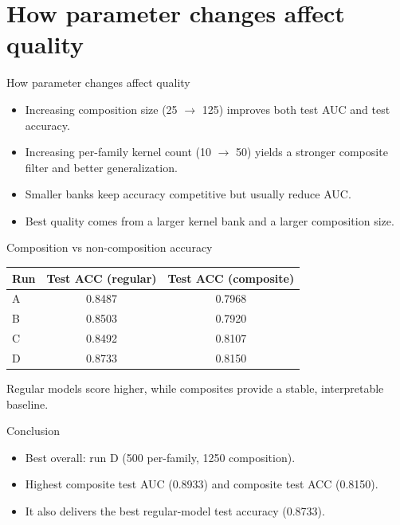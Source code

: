 \documentclass[aspectratio=169]{beamer}
\begin{document}
\section*{How parameter changes affect quality}
\begin{frame}{How parameter changes affect quality}
  \begin{itemize}
    \item Increasing composition size (25 $\rightarrow$ 125) improves both test AUC and test accuracy.
    \item Increasing per-family kernel count (10 $\rightarrow$ 50) yields a stronger composite filter and better generalization.
    \item Smaller banks keep accuracy competitive but usually reduce AUC.
    \item Best quality comes from a larger kernel bank and a larger composition size.
  \end{itemize}
\end{frame}

\begin{frame}{Composition vs non-composition accuracy}
  \begin{center}
    \begin{tabular}{lcc}
      \toprule
      Run & Test ACC (regular) & Test ACC (composite) \\
      \midrule
      A & 0.8487 & 0.7968 \\
      B & 0.8503 & 0.7920 \\
      C & 0.8492 & 0.8107 \\
      D & 0.8733 & 0.8150 \\
      \bottomrule
    \end{tabular}
  \end{center}
  \vspace{0.5em}
  \small Regular models score higher, while composites provide a stable, interpretable baseline.
\end{frame}

\begin{frame}{Conclusion}
  \begin{itemize}
    \item Best overall: run D (500 per-family, 1250 composition).
    \item Highest composite test AUC (0.8933) and composite test ACC (0.8150).
    \item It also delivers the best regular-model test accuracy (0.8733).
  \end{itemize}
\end{frame}
\end{document}
